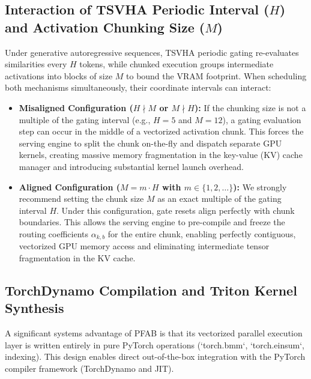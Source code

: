 \documentclass{article}
\theoremstyle{plain}
\theoremstyle{definition}
\theoremstyle{remark}
\begin{document}
\subsection{Interaction of TSVHA Periodic Interval ($H$) and Activation Chunking Size ($M$)}
Under generative autoregressive sequences, TSVHA periodic gating re-evaluates similarities every $H$ tokens, while chunked execution groups intermediate activations into blocks of size $M$ to bound the VRAM footprint. When scheduling both mechanisms simultaneously, their coordinate intervals can interact:
\begin{itemize}
  \item \textbf{Misaligned Configuration ($H \nmid M$ or $M \nmid H$):} If the chunking size is not a multiple of the gating interval (e.g., $H=5$ and $M=12$), a gating evaluation step can occur in the middle of a vectorized activation chunk. This forces the serving engine to split the chunk on-the-fly and dispatch separate GPU kernels, creating massive memory fragmentation in the key-value (KV) cache manager and introducing substantial kernel launch overhead.
  \item \textbf{Aligned Configuration ($M = m \cdot H$ with $m \in \{1, 2, \dots\}$):} We strongly recommend setting the chunk size $M$ as an exact multiple of the gating interval $H$. Under this configuration, gate resets align perfectly with chunk boundaries. This allows the serving engine to pre-compile and freeze the routing coefficients $\alpha_{k, b}$ for the entire chunk, enabling perfectly contiguous, vectorized GPU memory access and eliminating intermediate tensor fragmentation in the KV cache.
\end{itemize}

\subsection{TorchDynamo Compilation and Triton Kernel Synthesis}
A significant systems advantage of \textsc{PFAB} is that its vectorized parallel execution layer is written entirely in pure PyTorch operations (`torch.bmm`, `torch.einsum`, indexing). This design enables direct out-of-the-box integration with the PyTorch compiler framework (TorchDynamo and JIT).
\end{document}
